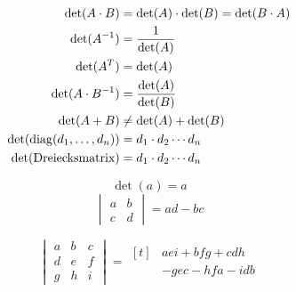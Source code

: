 \begin{formulabox}
  \[
  \begin{aligned}
    \det(A \cdot B) &= \det(A) \cdot \det(B) = \det(B \cdot A) \\
    \det(A^{-1}) &= \frac{1}{\det(A)} \\
    \det(A^T) &= \det(A) \\
    \det(A \cdot B^{-1}) &= \frac{\det(A)}{\det(B)} \\
    \det(A + B) &\neq \det(A) + \det(B) \\
    \det(\operatorname{diag}(d_1, \dots, d_n)) &= d_1 \cdot d_2 \cdots d_n \\
    \det(\text{Dreiecksmatrix}) &= d_1 \cdot d_2 \cdots d_n
  \end{aligned}
  \]
\end{formulabox}


\begin{formulabox}
  \[ \det(a) = a \]
  \[ \begin{vmatrix} a & b \\ c & d \end{vmatrix} = a d - b c \]
\end{formulabox}

\begin{defbox}
  \begin{splitbox}[split=0.32, align=center]
    \tcblower
    \[
    \begin{vmatrix} a & b & c \\ d & e & f \\ g & h & i \end{vmatrix}
    = \begin{aligned}[t]
      &aei + bfg + cdh \\
      &- gec - hfa - idb
    \end{aligned}
    \]
  \end{splitbox}
\end{defbox}

